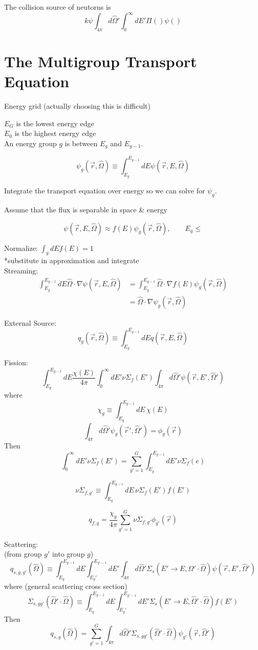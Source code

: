 \documentclass{report}
\newcommand{\h}[1]{\section*{#1}}
\newcommand{\Xs}{\Sigma}
\newcommand{\pos}{\vec{r}}
\newcommand{\Oh}{\hat{\Omega}}
\newcommand{\intfp}{\int_{4\pi}}
\newcommand{\intzi}{\int_0^{\infty}}
\newcommand{\rEO}{(\pos,E,\Oh)}
\newcommand{\rEOprime}{(\pos,E',\Oh')}
\begin{document}
The collision source of neutorns is
$$ k\psi \intfp d\Oh' \intzi dE' \Pi()\psi() $$


\h{The Multigroup Transport Equation}

Energy grid (actually choosing this is difficult)

$E_G$ is the lowest energy edge \\
$E_0$ is the highest energy edge \\

An energy group $g$ is between $E_g$ and $E_{g-1}$.

$$ \psi_g(\pos,\Oh) \equiv \int_{E_g}^{E_{g-1}} dE \psi\rEO $$

Integrate the transport equation over energy so we can solve for $\psi_g$.

Assume that the flux is separable in space \& energy

$$ \psi\rEO \approx f(E)\psi_g (\pos,\Oh), \qquad E_g \leq $$

Normalize: $ \int_g dE f(E) = 1 $\\
*substitute in approximation and integrate\\

Streaming:
\begin{align*}
\int_{E_g}^{E_{g-1}} dE \Oh \cdot \nabla \psi\rEO &= \int_{E_g}^{E_{g-1}} \Oh \cdot \nabla f(E) \psi_g(\pos,\Oh) \\
		&= \Oh \cdot \nabla \psi_g(\pos,\Oh)
\end{align*}

External Source:\\
$$ q_g(\pos,\Oh) \equiv \int_{E_g}^{E_{g-1}} dE q\rEO $$


Fission:\\
$$ \int_{E_g}^{E_{g-1}} dE \frac{\chi(E)}{4\pi} \intzi dE' \nu \Xs_f(E') \intfp d\Oh' \psi\rEOprime $$
where
$$ \chi_g \equiv \int_{E_g}^{E_{g-1}} dE \, \chi(E) $$
$$ \intfp d\Oh' \psi_g(\pos',\Oh') = \phi_g(\pos) $$
Then
$$ \intzi dE' \nu \Xs_f(E') = \sum_{g'=1}^{G} \int_{E_g}^{E_{g-1}} dE' \nu \Xs_f(e) $$

$$\nu\Xs_{f,g'} \equiv \int_{E_g}^{E_{g-1}} dE \, \nu \Xs_f(E')f(E') $$

$$ q_{f,g} = \frac{\chi_g}{4\pi} \sum_{g'=1}^{G} \nu\Xs_{f,g'} \phi_{g'}(\pos) $$


Scattering: \\
(from group $g'$ into group $g$)
$$ q_{s,g,g'}(\Oh) \equiv \int_{E_g}^{E_{g-1}} dE \int_{E_g'}^{E_{g'-1}} dE' \intfp d\Oh' \Xs_s(E' \rightarrow E, \Oh' \cdot \Oh)\psi\rEOprime $$
where (general scattering cross section)
$$ \Xs_{s,gg'}(\Oh' \cdot \Oh) \equiv \int_{E_g}^{E_{g-1}} dE \int_{E_g'}^{E_{g'-1}} dE' \Xs_s(E' \rightarrow E, \Oh' \cdot \Oh) f(E') $$
Then
$$ q_{s,g}(\Oh) = \sum_{g'=1}^G \intfp d\Oh' \Xs_{s,gg'}(\Oh' \cdot \Oh) \psi_{g'}(\pos,\Oh') $$
\end{document}
